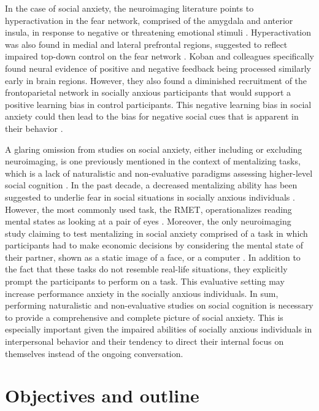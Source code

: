In the case of social anxiety, the neuroimaging literature points to hyperactivation in the fear network, comprised of the amygdala and anterior insula, in response to negative or threatening emotional stimuli \citep{bruhl2014,etkin2007}. Hyperactivation was also found in medial and lateral prefrontal regions, suggested to reflect impaired top-down control on the fear network \citep{bruhl2014,koban2023}. Koban and colleagues specifically found neural evidence of positive and negative feedback being processed similarly early in brain regions. However, they also found a diminished recruitment of the frontoparietal network in socially anxious participants that would support a positive learning bias in control participants. This negative learning bias in social anxiety could then lead to the bias for negative social cues that is apparent in their behavior \citep{alvi2020}. 

A glaring omission from studies on social anxiety, either including or excluding neuroimaging, is one previously mentioned in the context of mentalizing tasks, which is a lack of naturalistic and non-evaluative paradigms assessing higher-level social cognition \citep{freitas-ferrari2010}. In the past decade, a decreased mentalizing ability has been suggested to underlie fear in social situations in socially anxious individuals \citep{hezel2014}. However, the most commonly used task, the RMET, operationalizes reading mental states as looking at a pair of eyes \citep[for a review]{baez2023}. Moreover, the only neuroimaging study claiming to test mentalizing in social anxiety comprised of a task in which participants had to make economic decisions by considering the mental state of their partner, shown as a static image of a face, or a computer \citep{sripada2009}. In addition to the fact that these tasks do not resemble real-life situations, they explicitly prompt the participants to perform on a task. This evaluative setting may increase performance anxiety in the socially anxious individuals. In sum, performing naturalistic and non-evaluative studies on social cognition is necessary to provide a comprehensive and complete picture of social anxiety. This is especially important given the impaired abilities of socially anxious individuals in interpersonal behavior and their tendency to direct their internal focus on themselves instead of the ongoing conversation.


\section*{Objectives and outline}

